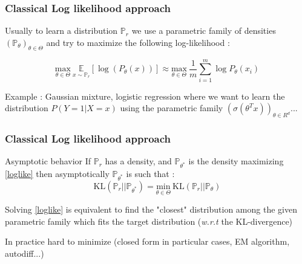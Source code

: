 \documentclass[french,9pt]{beamer}
\begin{document}

\begin{frame}
\frametitle{Classical Log likelihood approach}

Usually to learn a distribution $\mathbb{P}_{r}$ we use a parametric family of densities $(\mathbb{P}_{\theta})_{\theta \in \Theta}$ and try to maximize the following log-likelihood  :

\begin{equation}
\label{loglike}
 \underset{\theta \in \Theta}{\text{max}} \ \underset{x \sim \mathbb{P}_{r} }{\mathbb{E}}[\log(P_{\theta}(x))] \approx \underset{\theta \in \Theta}{\text{max}} \ \frac{1}{m} \sum_{i=1}^{m} \log P_{\theta}(x_{i})
 \end{equation}

Example : Gaussian mixture, logistic regression where we want to learn the distribution $P(Y=1|X=x)$ using the parametric family $(\sigma(\theta^{T} x))_{\theta \in R^{d}}$...

\begin{center}
\end{center}

\end{frame}

\begin{frame}
\frametitle{Classical Log likelihood approach}

\begin{block}{Asymptotic behavior}
If $\mathbb{P}_{r}$ has a density, and $\mathbb{P}_{\theta^{*}}$ is the density maximizing \eqref{loglike} then asymptotically $\mathbb{P}_{\theta^{*}}$ is such that : 
$$\text{KL}(\mathbb{P}_{r}||\mathbb{P}_{\theta^{*}})= \underset{\theta \in \Theta}{\text{min}} \ \text{KL}(\mathbb{P}_{r}||\mathbb{P}_{\theta})$$

Solving \eqref{loglike} is equivalent to find the "closest" distribution among the given parametric family which fits the target distribution (\textit{w.r.t} the KL-divergence)
\end{block}

In practice hard to minimize (closed form in particular cases, EM algorithm, autodiff...)

\end{frame}
\end{document}
